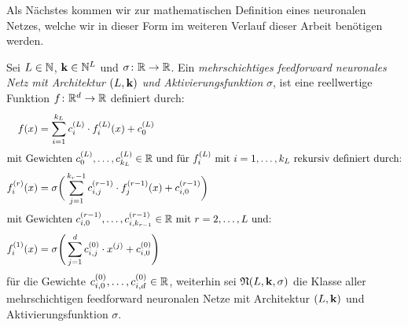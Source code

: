 Als Nächstes kommen wir zur mathematischen Definition eines neuronalen Netzes, welche wir in dieser Form im weiteren Verlauf dieser Arbeit benötigen werden.
\begin{defn}
\label{def:nn}
Sei $L \in \mathbb{N}$, $\mathbf{k} \in \mathbb{N}^L$ und $\sigma\colon \mathbb{R} \to \mathbb{R}$. Ein \emph{mehrschichtiges feedforward neuronales Netz mit Architektur $(L, \mathbf{k})$ und Aktivierungsfunktion} $\sigma$, ist eine reellwertige Funktion $f\colon \mathbb{R}^d \to \mathbb{R}$ definiert durch:
\begin{align}
\label{networkarch}
f(x) & = \sum_{i = 1}^{k_L} c_i^{(L)} \cdot f_i^{(L)}(x) + c_0^{(L)} \nonumber \\
\intertext{mit Gewichten $c_0^{(L)},\dots,c_{k_L}^{(L)} \in \mathbb{R}$ und für $f_i^{(L)}$ mit $i = 1,\dots,k_L$ rekursiv definiert durch:} 
f_i^{(r)}(x) & = \sigma \bigg(\sum_{j = 1}^{k_r - 1} c_{i,j}^{(r - 1)} \cdot f_j^{(r - 1)}(x) + c_{i,0}^{(r - 1)} \bigg)\\
\intertext{mit Gewichten $c_{i,0}^{(r - 1)},\dots,c_{i,k_{r - 1}}^{(r - 1)} \in \mathbb{R}$ mit $r = 2,\dots, L$ und:}
f_i^{(1)}(x) & = \sigma \Bigg(\sum_{j = 1}^{d} c_{i,j}^{(0)} \cdot x^{(j)} + c_{i,0}^{(0)} \Bigg) \nonumber
\end{align} 
für die Gewichte $c_{i,0}^{(0)},\dots,c_{i,d}^{(0)} \in \mathbb{R}$,
weiterhin sei $\mathfrak{N}(L, \mathbf{k}, \sigma)$ die Klasse aller mehrschichtigen feedforward neuronalen Netze mit Architektur $(L, \mathbf{k})$ und Aktivierungsfunktion $\sigma$.
\end{defn}

